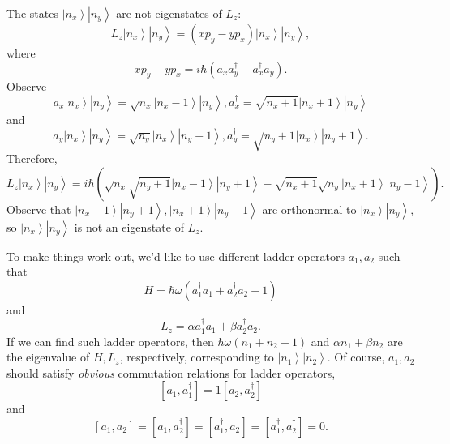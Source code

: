 \documentclass[phys334]{subfiles}
\begin{document}
    \np The states $\left| n_x \right\rangle\left| n_y \right\rangle$ are not eigenstates of $L_z$:
    \begin{equation*}
        L_z\left| n_x \right\rangle\left| n_y \right\rangle = \left( xp_y-yp_x \right)\left| n_x \right\rangle\left| n_y \right\rangle,
    \end{equation*}
    where
    \begin{equation*}
        xp_y-yp_x = i\hbar\left( a_xa_y^{\dagger}-a_x^{\dagger}a_y \right).
    \end{equation*}
    Observe
    \begin{equation*}
        a_x\left| n_x \right\rangle\left| n_y \right\rangle = \sqrt{n_x}\left| n_x-1 \right\rangle\left| n_y \right\rangle, a_x^{\dagger} = \sqrt{n_x+1}\left| n_x+1 \right\rangle\left| n_y \right\rangle
    \end{equation*}
    and
    \begin{equation*}
        a_y\left| n_x \right\rangle\left| n_y \right\rangle = \sqrt{n_y}\left| n_x \right\rangle\left| n_y-1 \right\rangle, a_y^{\dagger} = \sqrt{n_y+1}\left| n_x \right\rangle\left| n_y+1 \right\rangle.
    \end{equation*}
    Therefore,
    \begin{equation*}
        L_z\left| n_x \right\rangle\left| n_y \right\rangle = i\hbar \left( \sqrt{n_x}\sqrt{n_y+1}\left| n_x-1 \right\rangle\left| n_y+1 \right\rangle - \sqrt{n_x+1}\sqrt{n_y}\left| n_x+1 \right\rangle\left| n_y-1 \right\rangle \right) .
    \end{equation*}
    Observe that $\left| n_x-1 \right\rangle\left| n_y+1 \right\rangle,\left| n_x+1 \right\rangle\left| n_y-1 \right\rangle$ are orthonormal to $\left| n_x \right\rangle\left| n_y \right\rangle$, so $\left| n_x \right\rangle\left| n_y \right\rangle$ is not an eigenstate of $L_z$.

    \np To make things work out, we'd like to use different ladder operators $a_1,a_2$ such that
    \begin{equation*}
        H = \hbar\omega\left( a_1^{\dagger}a_1+a_2^{\dagger}a_2+1 \right)
    \end{equation*}
    and
    \begin{equation*}
        L_z = \alpha a^{\dagger}_1a_1 + \beta a_2^{\dagger}a_2.
    \end{equation*}
    If we can find such ladder operators, then $\hbar\omega\left( n_1+n_2+1 \right)$ and $\alpha n_1+\beta n_2$ are the eigenvalue of $H,L_z$, respectively, corresponding to $\left| n_1 \right\rangle\left| n_2 \right\rangle$. Of course, $a_1,a_2$ should satisfy \textit{obvious} commutation relations for ladder operators,
    \begin{equation*}
        \left[ a_1,a_1^{\dagger} \right] = 1 \left[ a_2,a_2^{\dagger} \right]
    \end{equation*}
    and
    \begin{equation*}
        \left[ a_1,a_2 \right] = \left[ a_1,a_2^{\dagger} \right] = \left[ a_1^{\dagger},a_2 \right] = \left[ a_1^{\dagger},a_2^{\dagger} \right] = 0.
    \end{equation*}
\end{document}

